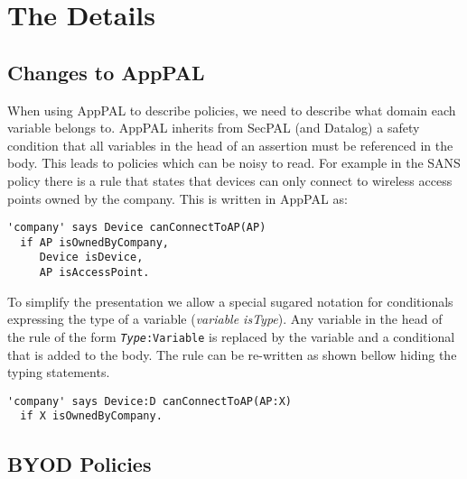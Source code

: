 \documentclass{article}
\begin{document}
\section{The Details}
\label{sec:details}

\subsection{Changes to AppPAL}

When using AppPAL to describe policies, we need to describe what domain each variable belongs to.
AppPAL inherits from SecPAL (and Datalog) a safety condition that all variables in the head of an assertion must be referenced in the body.
This leads to policies which can be noisy to read.
For example in the SANS policy there is a rule that states that devices can only connect to wireless access points owned by the company.
This is written in AppPAL as:
\begin{lstlisting}
'company' says Device canConnectToAP(AP)
  if AP isOwnedByCompany,
     Device isDevice,
     AP isAccessPoint.
\end{lstlisting}
To simplify the presentation we allow a special sugared notation for conditionals expressing the type of a variable (\emph{variable \emph{is}Type}).
Any variable in the head of the rule of the form \texttt{\emph{Type}:Variable} is replaced by the variable and a conditional that  is added to the body.
The rule can be re-written as shown bellow hiding the typing statements.
\begin{lstlisting}
'company' says Device:D canConnectToAP(AP:X)
  if X isOwnedByCompany.
\end{lstlisting}

\subsection{BYOD Policies}
\end{document}
